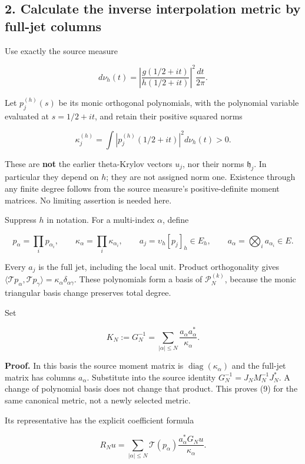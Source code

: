 \documentclass[
]{article}
\begin{document}
\subsection{2. Calculate the inverse interpolation metric by full-jet
columns}\label{calculate-the-inverse-interpolation-metric-by-full-jet-columns}

Use exactly the source measure

\[
d\nu_h(t)=\left|\frac{g(1/2+it)}{h(1/2+it)}\right|^2\frac{dt}{2\pi}.
\tag{6}
\]

Let \(p_j^{(h)}(s)\) be its monic orthogonal polynomials, with the
polynomial variable evaluated at \(s=1/2+it\), and retain their positive
squared norms

\[
\kappa_j^{(h)}=\int|p_j^{(h)}(1/2+it)|^2d\nu_h(t)>0.
\tag{7}
\]

These are \textbf{not} the earlier theta-Krylov vectors \(u_j\), nor
their norms \(\mathfrak h_j\). In particular they depend on \(h\); they
are not assigned norm one. Existence through any finite degree follows
from the source measure's positive-definite moment matrices. No limiting
assertion is needed here.

Suppress \(h\) in notation. For a multi-index \(\alpha\), define

\[
p_\alpha=\prod_i p_{\alpha_i},\qquad
\kappa_\alpha=\prod_i\kappa_{\alpha_i},\qquad
a_j=\upsilon_h[p_j]_h\in E_h,\qquad
a_\alpha=\bigotimes_i a_{\alpha_i}\in E.
\tag{8}
\]

Every \(a_j\) is the full jet, including the local unit. Product
orthogonality gives
\(\langle\mathcal T p_\alpha,\mathcal T p_\gamma\rangle=\kappa_\alpha\delta_{\alpha\gamma}\).
These polynomials form a basis of \(\mathcal P_N^{(k)}\), because the
monic triangular basis change preserves total degree.

Set

\[
\boxed{K_N:=G_N^{-1}
=\sum_{|\alpha|\le N}\frac{a_\alpha a_\alpha^*}{\kappa_\alpha}.}
\tag{9}
\]

\textbf{Proof.} In this basis the source moment matrix is
\(\operatorname{diag}(\kappa_\alpha)\) and the full-jet matrix has
columns \(a_\alpha\). Substitute into the source identity
\(G_N^{-1}=J_NM_N^{-1}J_N^*\). A change of polynomial basis does not
change that product. This proves (9) for the same canonical metric, not
a newly selected metric.

Its representative has the explicit coefficient formula

\[
R_Nu=\sum_{|\alpha|\le N}\mathcal T(p_\alpha)
\frac{a_\alpha^*G_Nu}{\kappa_\alpha}.
\tag{10}
\]
\end{document}
